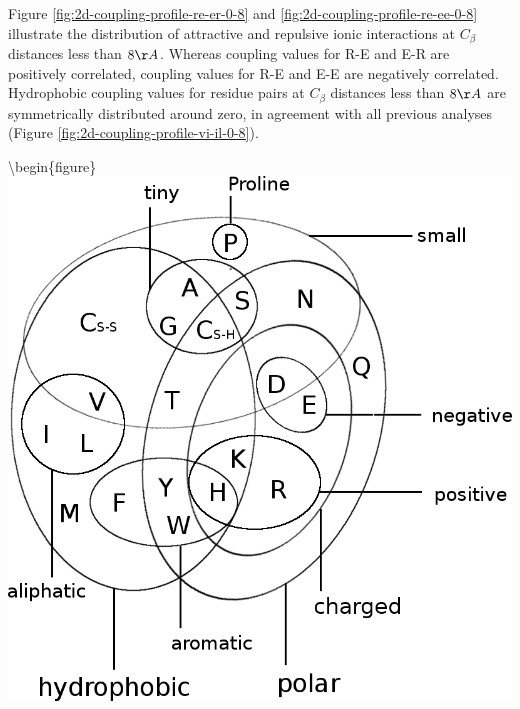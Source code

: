 \documentclass[12pt,a4paper,twoside]{book}
\newcommand{\Cb}{C_\beta}
\theoremstyle{definition}
\theoremstyle{definition}
\theoremstyle{remark}
\begin{document}
Figure \ref{fig:2d-coupling-profile-re-er-0-8} and
\ref{fig:2d-coupling-profile-re-ee-0-8} illustrate the distribution of
attractive and repulsive ionic interactions at \(\Cb\) distances less
than \(8\AA\). Whereas coupling values for R-E and E-R are positively
correlated, coupling values for R-E and E-E are negatively correlated.
Hydrophobic coupling values for residue pairs at \(\Cb\) distances less
than \(8\AA\) are symmetrically distributed around zero, in agreement
with all previous analyses (Figure
\ref{fig:2d-coupling-profile-vi-il-0-8}).








\textbackslash{}begin\{figure\}
\includegraphics[width=0.75\linewidth]{img/amino_acid_physico_chemical_properties_venn_diagramm}
\end{document}

